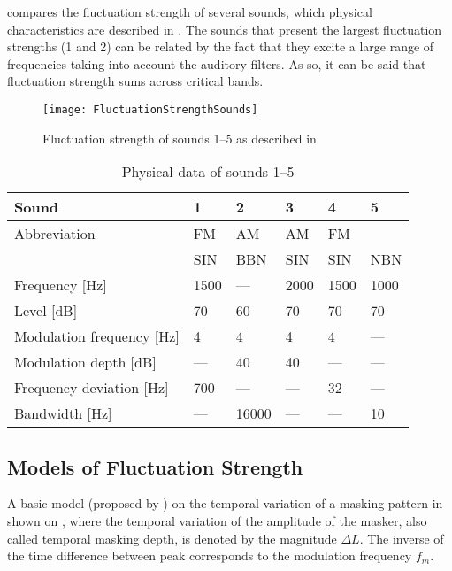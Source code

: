 \documentclass[../main.tex]{subfiles}
\begin{document}
\begin{theoreticalbackground}
 compares the fluctuation strength of several sounds,
which physical characteristics are described in . The
sounds that present the largest fluctuation strengths (1 and 2) can be related
by the fact that they excite a large range of frequencies taking into account
the auditory filters. As so, it can be said that fluctuation strength sums
across critical bands.

\begin{figure}
    \centering
    \texttt{[image: FluctuationStrengthSounds]}
    \caption{Fluctuation strength of sounds 1--5 as described in
         \cite[pp. 252]{Fastl2007Psychoacoustics}}
    \label{fig:flucstrensnds}
\end{figure}

\begin{table}
    \centering
    \begin{tabu} to \linewidth{ lXXXXX }
        \toprule
        Sound & 1 & 2 & 3 & 4 & 5 \\
        \midrule
        Abbreviation & FM & AM & AM & FM & \\
        & SIN & BBN & SIN & SIN & NBN \\
        Frequency [Hz] & 1500 & --- & 2000 & 1500 & 1000 \\
        Level [dB] & 70 & 60 & 70 & 70 & 70 \\
        Modulation frequency [Hz] & 4 & 4 & 4 & 4 & --- \\
        Modulation depth [dB] & --- & 40 & 40 & --- & --- \\
        Frequency deviation [Hz] & 700 & --- & --- & 32 & --- \\
        Bandwidth [Hz] & --- & 16000 & --- & --- & 10 \\
        \bottomrule
    \end{tabu}
    \caption{Physical data of sounds 1--5
        \cite[pp. 253]{Fastl2007Psychoacoustics}}
    \label{tab:flucstrensnds}
\end{table}

\subsection{Models of Fluctuation Strength}

A basic model (proposed by \citeauthor{Fastl2007Psychoacoustics}
\cite[pp.~254]{Fastl2007Psychoacoustics}) on the temporal variation of a masking
pattern in shown on , where the temporal variation of
the amplitude of the masker, also called temporal masking depth, is denoted by
the magnitude $\Delta L$. The inverse of the time difference between peak
corresponds to the modulation frequency $f_{m}$.


\end{theoreticalbackground}
\end{document}
